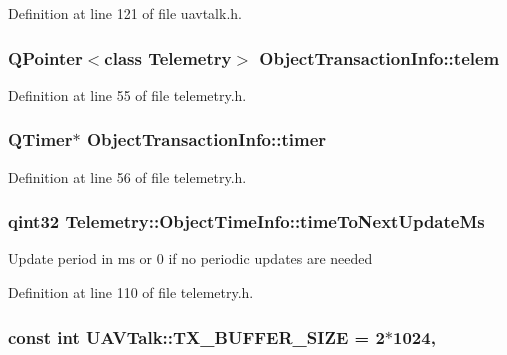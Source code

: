 Definition at line 121 of file uavtalk.\-h.

\hypertarget{group___u_a_v_talk_plugin_ga1df77178093618626fe21d5bc58b03f4}{
\subsubsection[{telem}]{\setlength{\rightskip}{0pt plus 5cm}Q\-Pointer$<$class {\bf Telemetry}$>$ Object\-Transaction\-Info\-::telem}}\label{group___u_a_v_talk_plugin_ga1df77178093618626fe21d5bc58b03f4}


Definition at line 55 of file telemetry.\-h.

\hypertarget{group___u_a_v_talk_plugin_gaf400de9c7d9b37a52e821b1a7bc6580e}{
\subsubsection[{timer}]{\setlength{\rightskip}{0pt plus 5cm}Q\-Timer$\ast$ Object\-Transaction\-Info\-::timer}}\label{group___u_a_v_talk_plugin_gaf400de9c7d9b37a52e821b1a7bc6580e}


Definition at line 56 of file telemetry.\-h.

\hypertarget{group___u_a_v_talk_plugin_gad3f8bd7cd7ca82748573626dde1055af}{
\subsubsection[{time\-To\-Next\-Update\-Ms}]{\setlength{\rightskip}{0pt plus 5cm}qint32 Telemetry\-::\-Object\-Time\-Info\-::time\-To\-Next\-Update\-Ms}}\label{group___u_a_v_talk_plugin_gad3f8bd7cd7ca82748573626dde1055af}
Update period in ms or 0 if no periodic updates are needed 

Definition at line 110 of file telemetry.\-h.

\hypertarget{group___u_a_v_talk_plugin_gaa84c0f2f2a83872a6f82f00969d9ddff}{
\subsubsection[{T\-X\-\_\-\-B\-U\-F\-F\-E\-R\-\_\-\-S\-I\-Z\-E}]{\setlength{\rightskip}{0pt plus 5cm}const {\bf int} U\-A\-V\-Talk\-::\-T\-X\-\_\-\-B\-U\-F\-F\-E\-R\-\_\-\-S\-I\-Z\-E = 2$\ast$1024\hspace{0.3cm}{\ttfamily [static]}, {\ttfamily [protected]}}}\label{group___u_a_v_talk_plugin_gaa84c0f2f2a83872a6f82f00969d9ddff}


